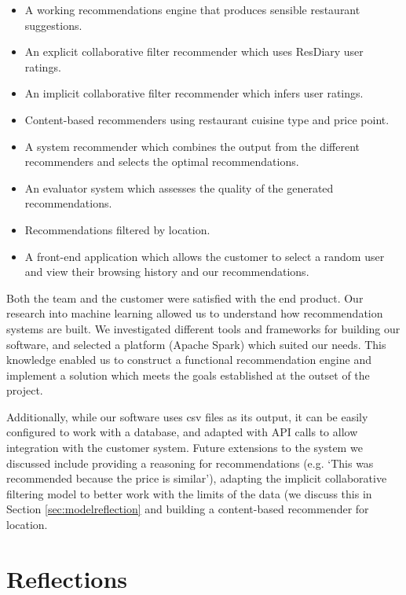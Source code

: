 \documentclass{l3proj}
\begin{document}
\begin{itemize}
\item A working recommendations engine that produces sensible restaurant suggestions. 
\item An explicit collaborative filter recommender which uses ResDiary user ratings.
\item An implicit collaborative filter recommender which infers user ratings.
\item Content-based recommenders using restaurant cuisine type and price point.
\item A system recommender which combines the output from the different recommenders and selects the optimal recommendations.
\item An evaluator system which assesses the quality of the generated recommendations.
\item Recommendations filtered by location. 
\item A front-end application which allows the customer to select a random user and view their browsing history and our recommendations.
\end{itemize}

Both the team and the customer were satisfied with the end product. Our research into machine learning allowed us to understand how recommendation systems are built. We investigated different tools and frameworks for building our software, and selected a platform (Apache Spark) which suited our needs. This knowledge enabled us to construct a functional recommendation engine and implement a solution which meets the goals established at the outset of the project. 

Additionally, while our software uses csv files as its output, it can be easily configured to work with a database, and adapted with API calls to allow integration with the customer system. Future extensions to the system we discussed include providing a reasoning for recommendations (e.g. `This was recommended because the price is similar'), adapting the implicit collaborative filtering model to better work with the limits of the data (we discuss this in Section \ref{sec:modelreflection} and building a content-based recommender for location.

\newpage

\section{Reflections}
\label{sec:reflections}
\end{document}
